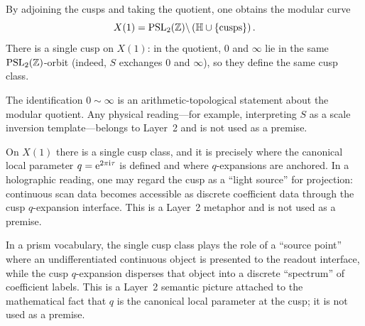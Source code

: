 By adjoining the cusps and taking the quotient, one obtains the modular curve
\begin{equation}
X(1) = \mathrm{PSL}_2(\mathbb{Z})\backslash \left(\mathbb{H} \cup \{\text{cusps}\}\right).
\end{equation}
There is a single cusp on $X(1)$: in the quotient, $0$ and $\infty$ lie in the same $\mathrm{PSL}_2(\mathbb{Z})$-orbit (indeed, $S$ exchanges $0$ and $\infty$), so they define the same cusp class.

\begin{remark}
The identification $0\sim\infty$ is an arithmetic-topological statement about the modular quotient. Any physical reading---for example, interpreting $S$ as a scale inversion template---belongs to Layer~2 and is not used as a premise.
\end{remark}

\begin{remark}
On $X(1)$ there is a single cusp class, and it is precisely where the canonical local parameter $q=\mathrm{e}^{2\pi\mathrm{i}\tau}$ is defined and where $q$-expansions are anchored. In a holographic reading, one may regard the cusp as a ``light source'' for projection: continuous scan data becomes accessible as discrete coefficient data through the cusp $q$-expansion interface. This is a Layer~2 metaphor and is not used as a premise.
\end{remark}

\begin{remark}
In a prism vocabulary, the single cusp class plays the role of a ``source point'' where an undifferentiated continuous object is presented to the readout interface, while the cusp $q$-expansion disperses that object into a discrete ``spectrum'' of coefficient labels. This is a Layer~2 semantic picture attached to the mathematical fact that $q$ is the canonical local parameter at the cusp; it is not used as a premise.
\end{remark}



